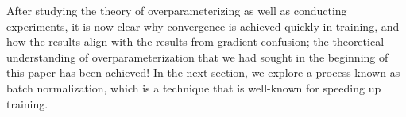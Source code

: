 \documentclass{article}
\begin{document}
After studying the theory of overparameterizing as well as conducting experiments, it is now clear why convergence is achieved quickly in training, and how the results align with the results from gradient confusion; the theoretical understanding of overparameterization that we had sought in the beginning of this paper has been achieved!  In the next section, we explore a process known as batch normalization, which is a technique that is well-known for speeding up training.

\pagebreak

\end{document}
